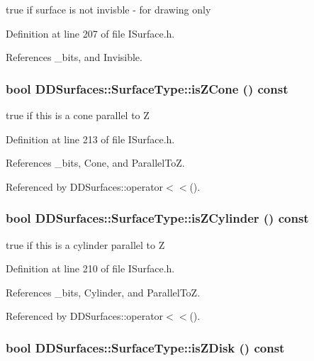 true if surface is not invisble -\/ for drawing only 

Definition at line 207 of file ISurface.h.

References \_\-bits, and Invisible.\hypertarget{class_d_d_surfaces_1_1_surface_type_a545a4725a93ede9b1d5cab3cb3e55bf1}{
\subsubsection[{isZCone}]{\setlength{\rightskip}{0pt plus 5cm}bool DDSurfaces::SurfaceType::isZCone () const}}
\label{class_d_d_surfaces_1_1_surface_type_a545a4725a93ede9b1d5cab3cb3e55bf1}


true if this is a cone parallel to Z 

Definition at line 213 of file ISurface.h.

References \_\-bits, Cone, and ParallelToZ.

Referenced by DDSurfaces::operator$<$$<$().\hypertarget{class_d_d_surfaces_1_1_surface_type_af2fb8402767dd7fe34d9cd9779f02fdb}{
\subsubsection[{isZCylinder}]{\setlength{\rightskip}{0pt plus 5cm}bool DDSurfaces::SurfaceType::isZCylinder () const}}
\label{class_d_d_surfaces_1_1_surface_type_af2fb8402767dd7fe34d9cd9779f02fdb}


true if this is a cylinder parallel to Z 

Definition at line 210 of file ISurface.h.

References \_\-bits, Cylinder, and ParallelToZ.

Referenced by DDSurfaces::operator$<$$<$().\hypertarget{class_d_d_surfaces_1_1_surface_type_a02a7fe9ec9f7ad6ebd98b0a1b36a39b3}{
\subsubsection[{isZDisk}]{\setlength{\rightskip}{0pt plus 5cm}bool DDSurfaces::SurfaceType::isZDisk () const}}
\label{class_d_d_surfaces_1_1_surface_type_a02a7fe9ec9f7ad6ebd98b0a1b36a39b3}


